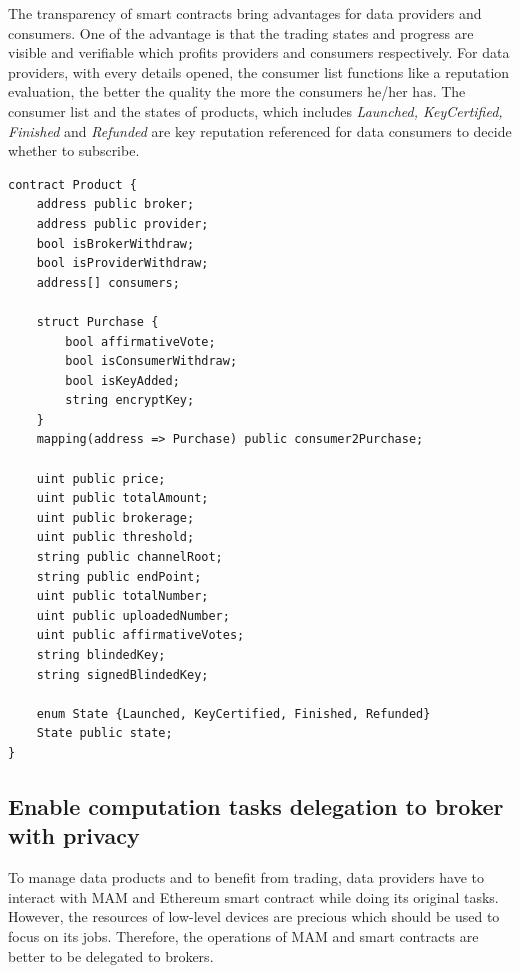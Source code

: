 \documentclass[conference]{IEEEtran}
\begin{document}
The transparency of smart contracts bring advantages for data providers and consumers. One of the advantage is that the trading states and progress are visible and verifiable which profits providers and consumers respectively. For data providers, with every details opened, the consumer list functions like a reputation evaluation, the better the quality the more the consumers he/her has. The consumer list and the states of products, which includes \textit{Launched, KeyCertified, Finished} and \textit{Refunded} are key reputation referenced for data consumers to decide whether to subscribe. 

\lstset{style=solidity}
\begin{lstlisting}[caption={Product Contract data fields}, label={lst:constructor}, frame=single]
contract Product {
    address public broker;
    address public provider;
    bool isBrokerWithdraw;
    bool isProviderWithdraw;
    address[] consumers;
    
    struct Purchase {
        bool affirmativeVote;
        bool isConsumerWithdraw;
        bool isKeyAdded;
        string encryptKey;
    }
    mapping(address => Purchase) public consumer2Purchase;
    
    uint public price;
    uint public totalAmount;
    uint public brokerage;
    uint public threshold;
    string public channelRoot;
    string public endPoint;
    uint public totalNumber;
    uint public uploadedNumber;
    uint public affirmativeVotes;
    string blindedKey;
    string signedBlindedKey;
    
    enum State {Launched, KeyCertified, Finished, Refunded}
    State public state;
}
\end{lstlisting}

\subsection{Enable computation tasks delegation to broker with privacy}
To manage data products and to benefit from trading, data providers have to interact with MAM and Ethereum smart contract while doing its original tasks. However, the resources of low-level devices are precious which should be used to focus on its jobs. Therefore, the operations of MAM and smart contracts are better to be delegated to brokers. 
\end{document}
